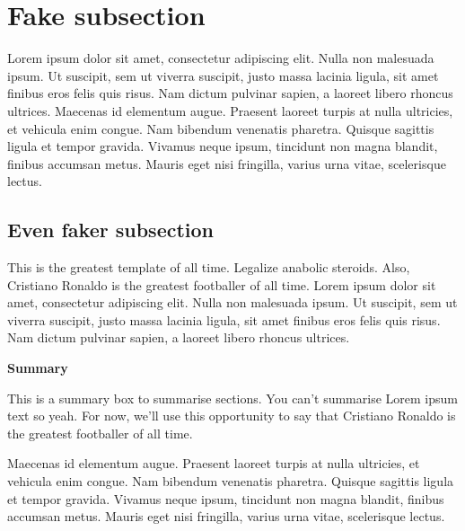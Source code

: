 \section{Fake subsection}
Lorem ipsum dolor sit amet, consectetur adipiscing elit. Nulla non malesuada ipsum. Ut suscipit, sem ut viverra suscipit, justo massa lacinia ligula, sit amet finibus eros felis quis risus.
Nam dictum pulvinar sapien, a laoreet libero rhoncus ultrices. Maecenas id elementum augue. Praesent laoreet turpis at nulla ultricies, et vehicula enim congue. Nam bibendum venenatis pharetra. Quisque sagittis ligula et tempor gravida. Vivamus neque ipsum, tincidunt non magna blandit, finibus accumsan metus. Mauris eget nisi fringilla, varius urna vitae, scelerisque lectus. 
\subsection{Even faker subsection}
\lipsum[2]
This is the greatest template of all time. Legalize anabolic steroids.
Also, Cristiano Ronaldo is the greatest footballer of all time.
Lorem ipsum dolor sit amet, consectetur adipiscing elit. Nulla non malesuada ipsum. Ut suscipit, sem ut viverra suscipit, justo massa lacinia ligula, sit amet finibus eros felis quis risus.
Nam dictum pulvinar sapien, a laoreet libero rhoncus ultrices.
\begin{summary}
  \textbf{Summary} 

  This is a summary box to summarise sections. 
  You can't summarise Lorem ipsum text so yeah. For now, we'll use this opportunity to say that Cristiano Ronaldo is the greatest footballer of all time.
  \end{summary}
  \lipsum[1]
Maecenas id elementum augue. Praesent laoreet turpis at nulla ultricies, et vehicula enim congue. Nam bibendum venenatis pharetra. Quisque sagittis ligula et tempor gravida. Vivamus neque ipsum, tincidunt non magna blandit, finibus accumsan metus. Mauris eget nisi fringilla, varius urna vitae, scelerisque lectus. 